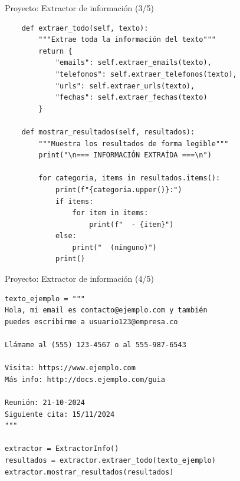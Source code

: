 \documentclass{beamer}
\begin{document}
\begin{frame}[fragile]{Proyecto: Extractor de información (3/5) \faSearch}
\begin{lstlisting}
    def extraer_todo(self, texto):
        """Extrae toda la información del texto"""
        return {
            "emails": self.extraer_emails(texto),
            "telefonos": self.extraer_telefonos(texto),
            "urls": self.extraer_urls(texto),
            "fechas": self.extraer_fechas(texto)
        }
    
    def mostrar_resultados(self, resultados):
        """Muestra los resultados de forma legible"""
        print("\n=== INFORMACIÓN EXTRAÍDA ===\n")
        
        for categoria, items in resultados.items():
            print(f"{categoria.upper()}:")
            if items:
                for item in items:
                    print(f"  - {item}")
            else:
                print("  (ninguno)")
            print()
\end{lstlisting}
\end{frame}

\begin{frame}[fragile]{Proyecto: Extractor de información (4/5) \faPlayCircle}
\begin{lstlisting}
texto_ejemplo = """
Hola, mi email es contacto@ejemplo.com y también
puedes escribirme a usuario123@empresa.co

Llámame al (555) 123-4567 o al 555-987-6543

Visita: https://www.ejemplo.com
Más info: http://docs.ejemplo.com/guia

Reunión: 21-10-2024
Siguiente cita: 15/11/2024
"""

extractor = ExtractorInfo()
resultados = extractor.extraer_todo(texto_ejemplo)
extractor.mostrar_resultados(resultados)
\end{lstlisting}
\end{frame}
\end{document}
